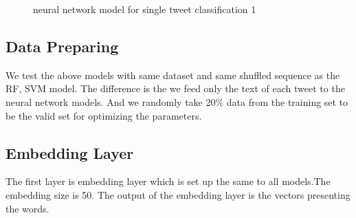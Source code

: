 \begin{figure}[!h]
{}
\caption{neural network model for single tweet classification 1}
\label{fig:NNModel1}
\end{figure}



  \subsection{Data Preparing} %
We test the above models with same dataset and same shuffled sequence as the RF, SVM model. The difference is the we feed only the text of each tweet to the neural network models. And we randomly take 20\% data from the training set to be the valid set for optimizing the parameters. 
 \subsection{Embedding Layer}  
 The first layer is embedding layer which is set up the same to all models.The embedding size is 50. The output of the embedding layer is the vectors presenting the words.  
